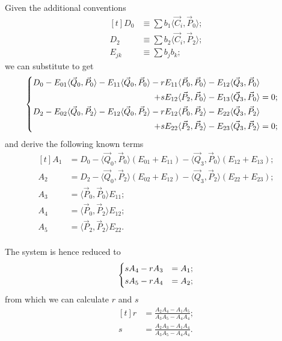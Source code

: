 \documentclass{scrartcl}
\newcommand\V[1]{\vec{#1}}
\newcommand\SP[2]{\langle #1, #2 \rangle}
\begin{document}
Given the additional conventions
\begin{equation}\label{eq:DE}
\begin{aligned}[t]
    D_0 &\equiv \sum b_1 \SP{\V{C}_i}{\V{P}_0}; \\
    D_2 &\equiv \sum b_2 \SP{\V{C}_i}{\V{P}_2}; \\
    E_{jk} &\equiv \sum b_j b_k;
\end{aligned}
\end{equation}
we can substitute to get
\begin{equation*}
\begin{dcases}
\begin{split}
    D_0 - E_{01}   \SP{\V{Q}_0}{\V{P}_0} -
	  E_{11}   \SP{\V{Q}_0}{\V{P}_0} -
	  r E_{11} \SP{\V{P}_0}{\V{P}_0} -
	  E_{12}   \SP{\V{Q}_3}{\V{P}_0} \\ +
	  s E_{12} \SP{\V{P}_2}{\V{P}_0} -
	  E_{13}   \SP{\V{Q}_3}{\V{P}_0} &= 0;
\end{split} \\
\begin{split}
    D_2 - E_{02}   \SP{\V{Q}_0}{\V{P}_2} -
	  E_{12}   \SP{\V{Q}_0}{\V{P}_2} -
	  r E_{12} \SP{\V{P}_0}{\V{P}_2} -
	  E_{22}   \SP{\V{Q}_3}{\V{P}_2} \\ +
	  s E_{22} \SP{\V{P}_2}{\V{P}_2} -
	  E_{23}   \SP{\V{Q}_3}{\V{P}_2} &= 0;
\end{split} \\
\end{dcases}
\end{equation*}
and derive the following known terms
\begin{equation}\label{eq:ACD}
\begin{aligned}[t]
A_1 &= D_0 -
    \SP{\V{Q}_0}{\V{P}_0} (E_{01} + E_{11}) -
    \SP{\V{Q}_3}{\V{P}_0} (E_{12} + E_{13}); \\
A_2 &= D_2 -
    \SP{\V{Q}_0}{\V{P}_2} (E_{02} + E_{12}) -
    \SP{\V{Q}_3}{\V{P}_2} (E_{22} + E_{23}); \\
A_3 &= \SP{\V{P}_0}{\V{P}_0} E_{11}; \\
A_4 &= \SP{\V{P}_0}{\V{P}_2} E_{12}; \\
A_5 &= \SP{\V{P}_2}{\V{P}_2} E_{22}. \\
\end{aligned}
\end{equation}

The system is hence reduced to
\begin{equation*}
\begin{dcases}
    s A_4 - r A_3 &= A_1; \\
    s A_5 - r A_4 &= A_2; \\
\end{dcases}
\end{equation*}
from which we can calculate $r$ and $s$
\begin{equation}\label{eq:rs}
\begin{aligned}[t]
    r &= \frac{A_2 A_4 - A_1 A_5}{A_3 A_5 - A_4 A_4}; \\
    s &= \frac{A_2 A_3 - A_1 A_4}{A_3 A_5 - A_4 A_4}. \\
\end{aligned}
\end{equation}
\end{document}
